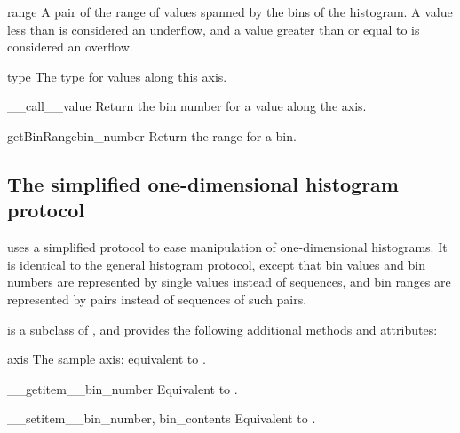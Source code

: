 \begin{memberdesc}{range}
 \readonly A pair  of the range of values spanned by
 the bins of the histogram.  A value less than  is considered
 an underflow, and a value greater than or equal to  is
 considered an overflow.
\end{memberdesc}

\begin{memberdesc}{type}
 \readonly The type for values along this axis.
\end{memberdesc}

\begin{methoddesc}{__call__}{value}
 Return the bin number for a value along the axis.  
\end{methoddesc}

\begin{methoddesc}{getBinRange}{bin_number}
 Return the range  for a bin.
\end{methoddesc}


\subsection{The simplified one-dimensional histogram protocol}

 uses a simplified protocol to ease manipulation of
one-dimensional histograms.  It is identical to the general histogram
protocol, except that bin values and bin numbers are represented by
single values instead of sequences, and bin ranges are represented by
 pairs instead of sequences of such pairs.

 is a subclass of , and provides the
following additional methods and attributes:

\begin{memberdesc}{axis}
 \readonly The sample axis; equivalent to .
\end{memberdesc}

\begin{methoddesc}{__getitem__}{bin_number}
 Equivalent to .
\end{methoddesc}

\begin{methoddesc}{__setitem__}{bin_number, bin_contents}
 Equivalent to .
\end{methoddesc}

